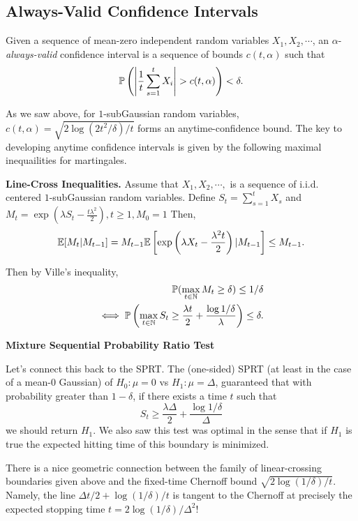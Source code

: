 \subsection{Always-Valid Confidence Intervals}

Given a sequence of mean-zero independent random variables $X_1, X_2, \cdots$, an $\alpha$-\textit{always-valid} confidence interval is a sequence of bounds $c(t, \alpha)$ such that 
\[\P\left(\left|\frac{1}{t}\sum_{s=1}^t X_i\right| > c(t, \alpha)\right) < \delta.\]

As we saw above, for $1$-subGaussian random variables, $c(t,\alpha) = \sqrt{2\log(2t^2/\delta)/t}$ forms an anytime-confidence bound. The key to developing anytime confidence intervals is given by the following maximal inequailities for martingales.

\noindent\textbf{Line-Cross Inequalities.} Assume that $X_1, X_2, \cdots, $ is a sequence of i.i.d. centered $1$-subGaussian random variables. Define $S_t = \sum_{s=1}^t X_s$ and $M_t = \exp\left(\lambda S_t - \frac{t\lambda^2}{2}\right), t\geq 1, M_0 =1$ Then,
\begin{align*}
    \E[M_t|M_{t-1}] = M_{t-1}\E\left[\exp\left(\lambda X_t - \frac{\lambda^2 t}{2}\right)|M_{t-1}\right] \leq M_{t-1}.
\end{align*}

Then by Ville's inequality,
\begin{align*}
    \P(\max_{t\in \mathbb{N}} M_t \geq \delta) \leq 1/\delta \\
    \iff \P\left(\max_{t\in \mathbb{N}} S_t \geq \frac{\lambda t}{2} +  \frac{\log{1/\delta}}{\lambda}\right) \leq \delta.
\end{align*}



\noindent\textbf{Mixture Sequential Probability Ratio Test}

Let's connect this back to the SPRT. The (one-sided) SPRT (at least in the case of a mean-0 Gaussian) of $H_0:\mu = 0$ vs $H_1:\mu = \Delta$, guaranteed that with probability greater than $1-\delta$, if there exists a time $t$ such that
\[S_t \geq \frac{\lambda \Delta}{2} +  \frac{\log{1/\delta}}{\Delta}\]
we should return $H_1$. We also saw this test was optimal in the sense that if $H_1$ is true the expected hitting time of this boundary is minimized. 

There is a nice geometric connection between the family of linear-crossing boundaries given above and the fixed-time Chernoff bound $\sqrt{2\log(1/\delta)/t}$. Namely, the line $\Delta t/2+ \log(1/\delta)/t$ is tangent to the Chernoff at precisely the expected stopping time $t = 2\log(1/\delta)/\Delta^2$!

